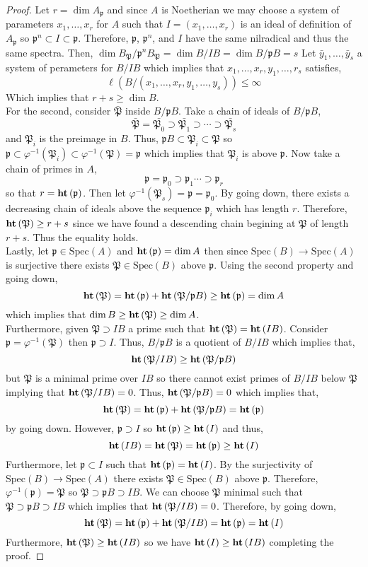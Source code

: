 \documentclass[12pt]{article}
\newcommand{\Spec}[1]{\mathrm{Spec}\left( #1 \right)}
\newcommand{\p}{\mathfrak{p}}
\renewcommand{\P}{\mathfrak{P}}
\theoremstyle{remark}
\theoremstyle{definition}
\begin{document}
\begin{proof}
Let $r = \dim{A_\p}$ and since $A$ is Noetherian we may choose a system of parameters $x_1, \dots, x_r$ for $A$ such that $I = (x_1, \dots, x_r)$ is an ideal of definition of $A_{\p}$ so $\p^n \subset I \subset \p$. Therefore, $\p$, $\p^n$, and $I$ have the same nilradical and thus the same spectra.
Then, $\dim{B_\P / \p^n B_{\P}} = \dim{B / IB} = \dim{B / \p B} = s$
Let $\bar{y}_1, \dots, \bar{y}_s$ a system of perameters for $B / IB$ which implies that $x_1, \dots, x_r, y_1, \dots, r_s$ satisfies,
\[ \ell\left(B / (x_1, \dots, x_r, y_1, \dots, y_s) \right) \le \infty \]
Which implies that $r + s \ge \dim{B}$.
\bigskip\\
For the second, consider $\bar{\P}$ inside $B / \p B$. Take a chain of ideals of $B / \p B$,
\[ \bar{\P} = \bar{\P_0} \supset  \bar{\P_1} \supset \cdots \supset  \bar{\P_s} \]
and $\P_i$ is the preimage in $B$. Thus, $\p B \subset \P_i \subset \P$ so $\p \subset \varphi^{-1}(\P_i) \subset \varphi^{-1}(\P) = \p$ which implies that $\P_i$ is above $\p$. Now take a chain of primes in $A$,
\[ \p = \p_0 \supset \p_{1} \cdots \supset \p_r \]
so that $r = \height{\p}$. Then let $\varphi^{-1}(\P_s) = \p = \p_0$. By going down, there exists a decreasing chain of ideals above the sequence $\p_i$ which has length $r$. Therefore, $\height{\P} \ge r + s$ since we have found a descending chain begining at $\P$ of length $r + s$. Thus the equality holds.
\bigskip\\
Lastly, let $\p \in \Spec{A}$ and $\height{\p} = \dim{A}$ then since $\Spec{B} \to \Spec{A}$ is surjective there exists $\P \in \Spec{B}$ above $\p$. Using the second property and going down,
\[ \height{\P} = \height{\p} + \height{\P / \p B} \ge \height{\p}  = \dim{A} \]
which implies that $\dim{B} \ge \height{\P} \ge \dim{A}$. 
\bigskip\\
Furthermore, given $\P \supset IB$ a prime such that $\height{\P} = \height{IB}$. Consider $\p = \varphi^{-1}(\P)$ then $\p \supset I$. Thus, $B / \p B$ is a quotient of $B / IB$ which implies that,
\[ \height{\P / I B} \ge \height{\P / \p B} \]
but $\P$ is a minimal prime over $IB$ so there cannot exist primes of $B / IB$ below $\P$ implying that $\height{\P / I B} = 0$. Thus, $\height{\P / \p B} = 0$ which implies that,
\[ \height{\P} = \height{\p} + \height{\P / \p B} = \height{\p} \]
by going down. However, $\p \supset I$ so $\height{\p} \ge \height{I}$ and thus,
\[ \height{IB} = \height{\P} = \height{\p} \ge \height{I} \]
Furthermore, let $\p \subset I$ such that $\height{\p} = \height{I}$. By the surjectivity of $\Spec{B} \to \Spec{A}$ there exists $\P \in \Spec{B}$ above $\p$. Therefore, $\varphi^{-1}(\p) = \P$ so $\P \supset \p B \supset IB$. We can choose $\P$ minimal such that $\P \supset \p B \supset IB$ which implies that $\height{\P / I B} = 0$. Therefore, by going down,
\[ \height{\P} = \height{\p} + \height{\P / IB} = \height{\p} = \height{I} \]
Furthermore, $\height{\P} \ge \height{IB}$ so we have $\mathbf{ht}\left( I \right) \ge \mathbf{ht}\left( IB \right)$ completing the proof. 
\end{proof}
\end{document}
